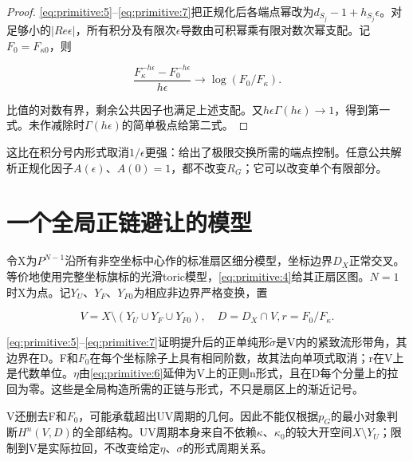 \documentclass[11pt,a4paper,oneside]{ctexrep}
\theoremstyle{cnplain}
\theoremstyle{definition}
\theoremstyle{remark}
\begin{document}
\begin{proof}

\eqref{eq:primitive:5}--\eqref{eq:primitive:7}把正规化后各端点幂改为\(d_{S_j}- 1+h_{S_j}\epsilon \)。对足够小的\(|Re \epsilon |\)，所有积分及有限次\(\epsilon \)导数由可积幂乘有限对数次幂支配。记\(F_0=F_{\kappa 0}\)，则

\begin{equation}
\frac{F_\kappa^{-h\epsilon}-F_0^{-h\epsilon}}{h\epsilon}
                    \longrightarrow\log(F_0/F_\kappa).
\end{equation}

比值的对数有界，剩余公共因子也满足上述支配。又\(h\epsilon \Gamma (h\epsilon )\to 1\)，得到第一式。未作减除时\(\Gamma (h\epsilon )\)的简单极点给第二式。

\end{proof}

这比在积分号内形式取消\(1/\epsilon \)更强：给出了极限交换所需的端点控制。任意公共解析正规化因子\(A(\epsilon )\)、\(A(0)=1\)，都不改变\(R_G\)；它可以改变单个有限部分。

\section{一个全局正链避让的模型}\label{sec:primitive:3}

令X为\(P^{N- 1}\)沿所有非空坐标中心作的标准扇区细分模型，坐标边界\(D_X\)正常交叉。等价地使用完整坐标旗标的光滑toric模型，\eqref{eq:primitive:4}给其正扇区图。\(N=1\)时X为点。记\(Y_U\)、\(Y_F\)、\(Y_{F0}\)为相应非边界严格变换，置

\begin{equation}
V=X\setminus(Y_U\cup Y_F\cup Y_{F0}),\quad D=D_X\cap V,
                         r=F_0/F_\kappa.                         \label{eq:primitive:9}
\end{equation}

\eqref{eq:primitive:5}--\eqref{eq:primitive:7}证明提升后的正单纯形\(\widetilde\sigma\)是V内的紧致流形带角，其边界在D。F和\(F_0\)在每个坐标除子上具有相同阶数，故其法向单项式取消；r在V上是代数单位。\(\eta \)由\eqref{eq:primitive:6}延伸为V上的正则n形式，且在D每个分量上的拉回为零。这些是全局构造所需的正链与形式，不只是扇区上的渐近记号。

V还删去F和\(F_0\)，可能承载超出UV周期的几何。因此不能仅根据\(p_G\)的最小对象判断\(H^n(V,D)\)的全部结构。UV周期本身来自不依赖\(\kappa \)、\(\kappa _0\)的较大开空间\(X\setminus Y_U\)；限制到V是实际拉回，不改变给定\(\eta \)、\(\sigma \)的形式周期关系。
\end{document}
